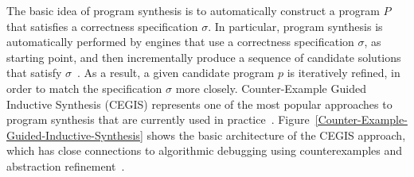 \documentclass[format=acmsmall, review=false, screen=true]{acmart}
\begin{document}
The basic idea of program synthesis is to automatically construct a program $P$ that satisfies a correctness specification $\sigma$. In particular, program synthesis is automatically performed by engines that use a correctness specification $\sigma$, as starting point, and then incrementally produce a sequence of candidate solutions that satisfy $\sigma$~\cite{David15,Abate17}. As a result, a given candidate program $p$ is iteratively refined, in order to match the specification $\sigma$ more closely. Counter-Example Guided Inductive Synthesis (CEGIS) represents one of the most popular approaches to program synthesis that are currently used in practice~\cite{David15}. Figure~\ref{Counter-Example-Guided-Inductive-Synthesis} shows the basic architecture of the CEGIS approach, which has close connections to algorithmic debugging using counterexamples and abstraction refinement~\cite{Alur13}. 
\end{document}
